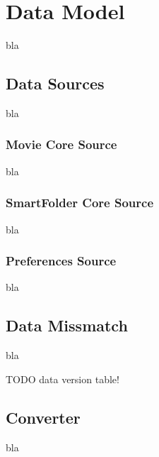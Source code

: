 % 
% 

\section{Data Model}

bla

\subsection{Data Sources}

bla

\subsubsection{Movie Core Source}

bla

\subsubsection{SmartFolder Core Source}

bla

\subsubsection{Preferences Source}

bla

\subsection{Data Missmatch}

bla

TODO data version table!

\subsection{Converter}

bla
